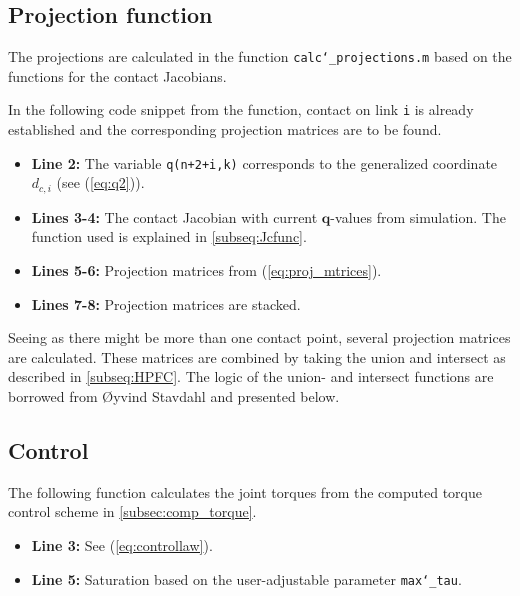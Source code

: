 \subsection{Projection function}

The projections are calculated in the function \texttt{calc\char`_projections.m} based on the functions for the contact Jacobians. 

In the following code snippet from the function, contact on link \texttt{i} is already established and the corresponding projection matrices are to be found.

\begin{itemize}
    \item \textbf{Line 2:} The variable \texttt{q(n+2+i,k)} corresponds to the generalized coordinate $d_{c,i}$ (see (\ref{eq:q2})).
    \item \textbf{Lines 3-4:} The contact Jacobian with current $\mathbf{q}$-values from simulation. The function used is explained in \ref{subseq:Jcfunc}.
    \item \textbf{Lines 5-6:} Projection matrices from (\ref{eq:proj_mtrices}).
    \item \textbf{Lines 7-8:} Projection matrices are stacked.
\end{itemize}




Seeing as there might be more than one contact point, several projection matrices are calculated. These matrices are combined by taking the union and intersect as described in \ref{subseq:HPFC}. The logic of the union- and intersect functions are borrowed from Øyvind Stavdahl and presented below.




\subsection{Control}
The following function calculates the joint torques from the computed torque control scheme in \ref{subsec:comp_torque}.

\begin{itemize}
    \item \textbf{Line 3:} See (\ref{eq:controllaw}).
    \item \textbf{Line 5:} Saturation based on the user-adjustable parameter \texttt{max\char`_tau}.
\end{itemize}

